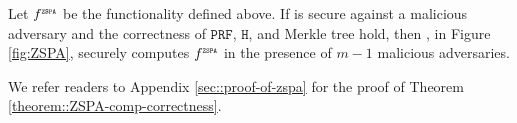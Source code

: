 
\vspace{-1.5mm}


\begin{theorem}\label{theorem::ZSPA-comp-correctness}
Let $f^{\scriptscriptstyle \mathtt{ZSPA}}$ be the functionality defined above. If \ct is secure against a malicious adversary and the correctness of $\mathtt{PRF}$, $\mathtt{H}$, and Merkle tree hold, then \zspa,  in Figure \ref{fig:ZSPA}, securely computes $f^{\scriptscriptstyle \mathtt{ZSPA}}$ in the presence of $m-1 $ malicious adversaries. 
\end{theorem}


We refer readers to Appendix \ref{sec::proof-of-zspa} for the proof of Theorem \ref{theorem::ZSPA-comp-correctness}. 









